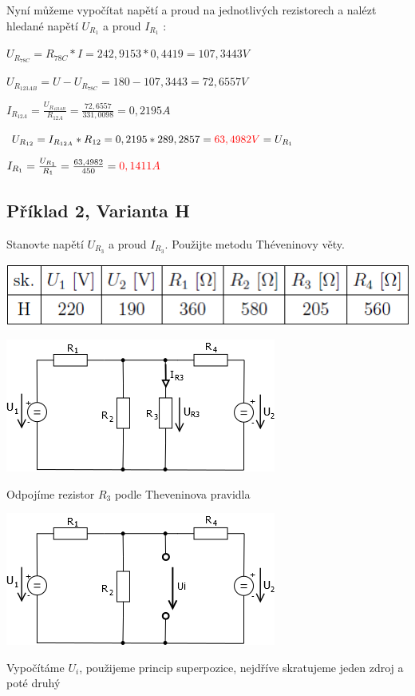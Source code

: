 \documentclass{article}
\begin{document}
\noindent Nyní můžeme vypočítat napětí a proud na jednotlivých rezistorech a nalézt hledané napětí $U_{R_1}$ a proud $I_{R_1}$ :

\vspace{1pc}
\centerline{$U_{R_{78C}} = R_{78C} *  I = 242,9153*0,4419 = 107,3443 V$}
\centerline{$U_{R_{123AB}} = U - U_{R_{78C}} = 180-107,3443 = 72,6557 V$}
\centerline{$I_{R_{12A}} = \frac{U_{R_{123AB}}}{R_{12A}} = \frac{72,6557}{331,0098} = 0,2195A$}
\centerline{$U_{R_{12}}  = I_{R_{12A}} * R_{12} = 0,2195*289,2857 = \textcolor{red}{63,4982V} = U_{R_1}$}
\centerline{$I_{R_1} = \frac{U_{R_1}}{R_1} = \frac{63,4982}{450} = \textcolor{red}{0,1411A}$}

\clearpage


\subsection{Příklad 2, Varianta H}
\centerline{Stanovte napětí $U_{R_3}$ a proud $I_{R_3}$. Použijte metodu Théveninovy věty.}

\vspace{1pc}
\centerline{\includegraphics{hodnoty2}}
\vspace{2pc}
\centerline{\includegraphics{zadani2}}
\vspace{2pc}

\noindent Odpojíme rezistor $R_3$ podle Theveninova pravidla

\vspace{1pc}
\centerline{\includegraphics{upraveny2}}
\clearpage
\vspace{2pc}
\noindent Vypočítáme $U_i$, použijeme princip superpozice, nejdříve skratujeme jeden zdroj a poté druhý
\end{document}
